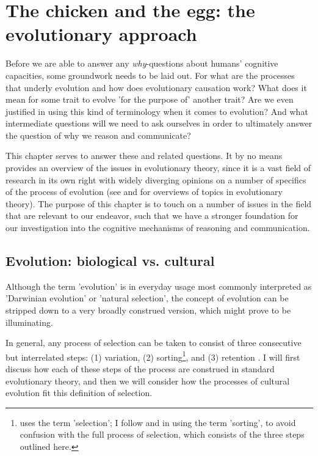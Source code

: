 \chapter{The chicken and the egg: the evolutionary approach}
\label{ch:evolution}

Before we are able to answer any \emph{why}-questions about humans' cognitive capacities, some groundwork needs to be laid out. For what are the processes that underly evolution and how does evolutionary causation work? What does it mean for some trait to evolve 'for the purpose of' another trait? Are we even justified in using this kind of terminology when it comes to evolution? And what intermediate questions will we need to ask ourselves in order to ultimately answer the question of why we reason and communicate?

This chapter serves to answer these and related questions. It by no means provides an overview of the issues in evolutionary theory, since it is a vast field of research in its own right with widely diverging opinions on a number of specifics of the process of evolution (see \citet{Ariew02} and \citet{UllerLaland19} for overviews of topics in evolutionary theory).
The purpose of this chapter is to touch on a number of issues in the field that are relevant to our endeavor, such that we have a stronger foundation for our investigation into the cognitive mechanisms of reasoning and communication.

\section{Evolution: biological vs. cultural}
\label{sec:evo-bio-culture}


Although the term 'evolution' is in everyday usage most commonly interpreted as 'Darwinian evolution' or 'natural selection', the concept of evolution can be stripped down to a very broadly construed version, which might prove to be illuminating.

In general, any process of selection can be taken to consist of three consecutive but interrelated steps: (1) variation, (2) sorting\footnote{\citet{Donahoe03} uses the term 'selection'; I follow \citet{Heyes18} and \citet{S-P13} in using the term 'sorting', to avoid confusion with the full process of selection, which consists of the three steps outlined here.}, and (3) retention \citep{Donahoe03}. I will first discuss how each of these steps of the process are construed in standard evolutionary theory, and then we will consider how the processes of cultural evolution fit this definition of selection.

